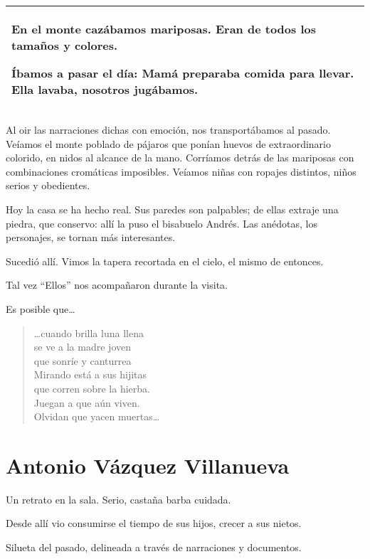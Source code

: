 \documentclass[a4paper]{article}
\begin{document}
\begin{table}[!ht]
    \centering
    \begin{tabular}{|p{10cm}|}
    \bottomrule
    En el monte cazábamos mariposas. Eran de todos los tamaños y colores.

    Íbamos a pasar el día: Mamá preparaba comida para llevar. Ella lavaba, nosotros jugábamos.\\
    \toprule
    \end{tabular}
\end{table}

Al oir las narraciones dichas con emoción, nos transportábamos al pasado. Veíamos el monte poblado de pájaros que ponían huevos de extraordinario colorido, en nidos al alcance de la mano. Corríamos detrás de las mariposas con combinaciones cromáticas imposibles. Veíamos niñas con ropajes distintos, niños serios y obedientes.

Hoy la casa se ha hecho real. Sus paredes son palpables; de ellas extraje una piedra, que conservo: allí la puso el bisabuelo Andrés. Las anédotas, los personajes, se tornan más interesantes. 

Sucedió allí. Vimos la tapera recortada en el cielo, el mismo de entonces.

Tal vez ``Ellos'' nos acompañaron durante la visita.

Es posible que\ldots

\begin{verse}
    \ldots cuando brilla luna llena\\
    se ve a la madre joven\\
    que sonríe y canturrea\\
    Mirando está a sus hijitas\\
    que corren sobre la hierba.\\
    Juegan a que aún viven.\\
    Olvidan que yacen muertas\ldots
\end{verse}

\section{Antonio Vázquez Villanueva}

Un retrato en la sala. Serio, castaña barba cuidada.

Desde allí vio consumirse el tiempo de sus hijos, crecer a sus nietos. 

Silueta del pasado, delineada a través de narraciones y documentos.
\end{document}
